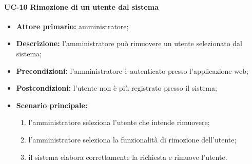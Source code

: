 \paragraph{UC-10 Rimozione di un utente dal sistema}
\begin{itemize}
    \item \textbf{Attore primario:} amministratore;

    \item \textbf{Descrizione:} l'amministratore può rimuovere un utente selezionato dal sistema;

    \item \textbf{Precondizioni:} l'amministratore è autenticato presso l'applicazione web;

    \item \textbf{Postcondizioni:} l'utente non è più registrato presso il sistema;

    \item \textbf{Scenario principale:}
          \begin{enumerate}
              \item l'amministratore seleziona l'utente che intende rimuovere;
              \item l'amministratore seleziona la funzionalità di rimozione dell'utente;
              \item il sistema elabora correttamente la richiesta e rimuove l'utente.
          \end{enumerate}
\end{itemize}